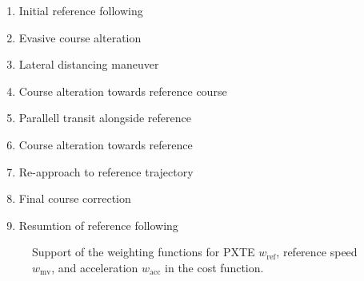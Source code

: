 \begin{enumerate}[itemsep=0.2ex, topsep=0.5ex, parsep=0pt]
    \item Initial reference following
    \item Evasive course alteration
    \item Lateral distancing maneuver
    \item Course alteration towards reference course
    \item Parallell transit alongside reference
    \item Course alteration towards reference
    \item Re-approach to reference trajectory
    \item Final course correction
    \item Resumtion of reference following
\end{enumerate}
 


\begin{figure}
    \centering
    
    \caption{Support of the weighting functions for PXTE $w_\text{ref}$, reference speed $w_\text{mv}$, and acceleration $w_\text{acc}$ in the cost function.}
    \label{fig:weight-functions}
\end{figure}



